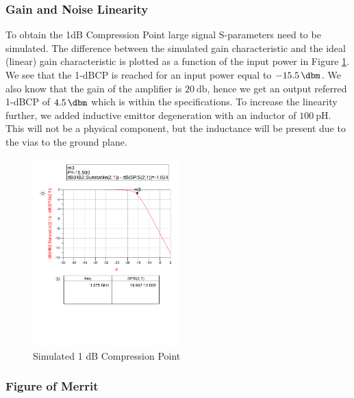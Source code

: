 \documentclass[a4paper]{article}        %
\begin{document}
		\subsubsection{Gain and Noise Linearity}

			To obtain the 1dB Compression Point large signal S-parameters need to be simulated. The difference between the simulated gain characteristic and the ideal (linear) gain characteristic is plotted as a function of the input power in Figure \ref{fig:lna_1dbcp}. We see that the 1-dBCP is reached for an input power equal to $\SI{-15.5}{\dbm}$. We also know that the gain of the amplifier is $\SI{20}{\decibel}$, hence we get an output referred 1-dBCP of $\SI{4.5}{\dbm}$ which is within the specifications. To increase the linearity further, we added inductive emittor degeneration with an inductor of $\SI{100}{\pico\henry}$. This will not be a physical component, but the inductance will be present due to the vias to the ground plane. 

			\begin{figure}[H]
			\centering
				\includegraphics[width=0.5\textwidth]{fig/LNA/compression_point.pdf}
			\caption{Simulated 1 dB Compression Point}
			\label{fig:lna_1dbcp}
			\end{figure}

		\subsubsection{Figure of Merrit}
\end{document}
